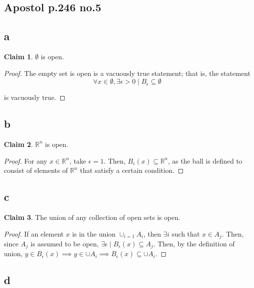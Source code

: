 \documentclass[12pt,letterpaper]{article}
\theoremstyle{definition}
\newtheorem*{claim}{Claim}
\newcommand{\R}{\mathbb{R}}
\begin{document}
\subsection*{Apostol p.246 no.5}

\subsection*{a}

\begin{claim}
  $\emptyset$ is open.  
\end{claim}

\begin{proof}
  The empty set is open is a vacuously true statement; that is, the statement
  \[
    \forall x \in \emptyset, \exists \epsilon > 0 \mid B_{\epsilon} \subseteq \emptyset
  \]

  is vacuously true.
\end{proof}


\subsection*{b}
\begin{claim}
  $\R^n$ is open.
\end{claim}

\begin{proof}
  For any $x \in \R^n$, take $\epsilon = 1$. Then, $B_{\epsilon}(x) \subseteq \R^n$,
  as the ball is defined to consist of elements of $\R^n$ that satisfy a certain
  condition.
\end{proof}

\subsection*{c}

\begin{claim}
  The union of any collection of open sets is open.
\end{claim}

\begin{proof}
  If an element $x$ is in the union $\cup_{i=1} A_i$, then $\exists i$ such that $x
  \in A_j$. Then, since $A_j$ is assumed to be open, $\exists \epsilon \mid
  B_\epsilon(x) \subseteq A_j$. Then, by the definition of union, $y \in
  B_{\epsilon}(x) \implies y \in \cup A_i \implies B_{\epsilon}(x) \subseteq \cup A_i$.
\end{proof}

\subsection*{d}
\end{document}

